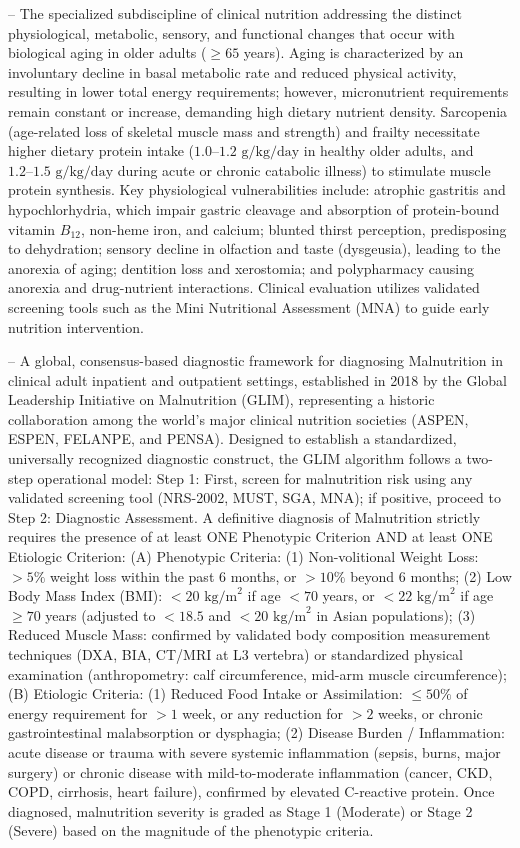 -- The specialized subdiscipline of clinical nutrition addressing the distinct physiological, metabolic, sensory, and functional changes that occur with biological aging in older adults ($\ge 65$ years). Aging is characterized by an involuntary decline in basal metabolic rate and reduced physical activity, resulting in lower total energy requirements; however, micronutrient requirements remain constant or increase, demanding high dietary nutrient density. Sarcopenia (age-related loss of skeletal muscle mass and strength) and frailty necessitate higher dietary protein intake ($1.0\text{--}1.2\text{ g/kg/day}$ in healthy older adults, and $1.2\text{--}1.5\text{ g/kg/day}$ during acute or chronic catabolic illness) to stimulate muscle protein synthesis. Key physiological vulnerabilities include: atrophic gastritis and hypochlorhydria, which impair gastric cleavage and absorption of protein-bound vitamin $B_{12}$, non-heme iron, and calcium; blunted thirst perception, predisposing to dehydration; sensory decline in olfaction and taste (dysgeusia), leading to the anorexia of aging; dentition loss and xerostomia; and polypharmacy causing anorexia and drug-nutrient interactions. Clinical evaluation utilizes validated screening tools such as the Mini Nutritional Assessment (MNA) to guide early nutrition intervention.

-- A global, consensus-based diagnostic framework for diagnosing Malnutrition in clinical adult inpatient and outpatient settings, established in 2018 by the Global Leadership Initiative on Malnutrition (GLIM), representing a historic collaboration among the world's major clinical nutrition societies (ASPEN, ESPEN, FELANPE, and PENSA). Designed to establish a standardized, universally recognized diagnostic construct, the GLIM algorithm follows a two-step operational model: Step 1: First, screen for malnutrition risk using any validated screening tool (NRS-2002, MUST, SGA, MNA); if positive, proceed to Step 2: Diagnostic Assessment. A definitive diagnosis of Malnutrition strictly requires the presence of at least ONE Phenotypic Criterion AND at least ONE Etiologic Criterion: (A) Phenotypic Criteria: (1) Non-volitional Weight Loss: $>5\%$ weight loss within the past 6 months, or $>10\%$ beyond 6 months; (2) Low Body Mass Index (BMI): $<20\text{ kg/m}^2$ if age $<70$ years, or $<22\text{ kg/m}^2$ if age $\ge 70$ years (adjusted to $<18.5$ and $<20\text{ kg/m}^2$ in Asian populations); (3) Reduced Muscle Mass: confirmed by validated body composition measurement techniques (DXA, BIA, CT/MRI at L3 vertebra) or standardized physical examination (anthropometry: calf circumference, mid-arm muscle circumference); (B) Etiologic Criteria: (1) Reduced Food Intake or Assimilation: $\le 50\%$ of energy requirement for $>1$ week, or any reduction for $>2$ weeks, or chronic gastrointestinal malabsorption or dysphagia; (2) Disease Burden / Inflammation: acute disease or trauma with severe systemic inflammation (sepsis, burns, major surgery) or chronic disease with mild-to-moderate inflammation (cancer, CKD, COPD, cirrhosis, heart failure), confirmed by elevated C-reactive protein. Once diagnosed, malnutrition severity is graded as Stage 1 (Moderate) or Stage 2 (Severe) based on the magnitude of the phenotypic criteria.

